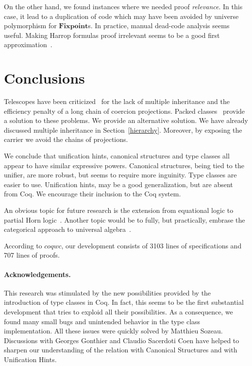 \documentclass[a4paper,10pt, runningheads]{llncs}
\newcommand{\Varid}[1]{\mathit{#1}}
\begin{document}
On the other hand, we found instances where we needed proof \emph{relevance}. In this case, it lead
to a duplication of code which may have been avoided by universe polymorphism for \ensuremath{\mathbf{Fixpoint}}s. In
practice, manual dead-code analysis seems useful. Making Harrop formulas proof irrelevant seems to
be a good first approximation~\cite{lcf:spi:03}.

\section{Conclusions}
Telescopes have been criticized~\cite{Packed} for the lack of multiple inheritance and
the efficiency penalty of a long chain of coercion projections. Packed classes~\cite{Packed} provide
a solution to these problems. We provide an alternative solution. We have already
discussed multiple inheritance in Section~\ref{hierarchy}. Moreover, by exposing the
carrier we avoid the chains of projections.

We conclude that unification hints, canonical structures and type classes all appear to have
similar expressive powers. Canonical structures, being tied to the unifier, are more robust, but
seems to require more inguinity. Type classes are easier to use. Unification hints, may be a
good generalization, but are absent from Coq. We encourage their inclusion to the
Coq system.

An obvious topic for future research is the extension from equational logic to partial Horn
logic~\cite{palmgren2007partial}. Another topic would be to fully, but practically, embrase the
categorical approach to universal algebra~\cite{pitts2001categorical}.

According to \ensuremath{\Varid{coqwc}}, our development consists of 3103 lines of specifications and 707 lines of
proofs.


% 

\paragraph{Acknowledgements.}
This research was stimulated by the new possibilities provided by the introduction of type classes
in Coq. In fact, this seems to be the first substantial development that tries to exploid all their
possibilities. As a consequence, we found many small bugs and unintended behavior in the type
class implementation. All these issues were quickly solved by Matthieu Sozeau. Discussions with
Georges Gonthier and Claudio Sacerdoti Coen have helped to
sharpen our understanding of the relation with Canonical Structures and with Unification Hints.


\end{document}
